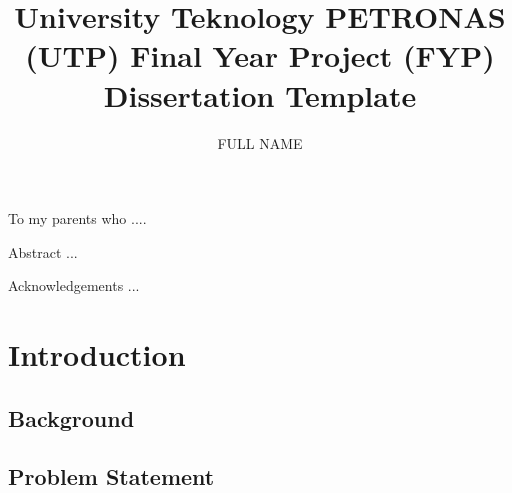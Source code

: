\documentclass[a4paper,12pt,oneside]{report}
\begin{document}
\title{University Teknology PETRONAS (UTP) Final Year Project (FYP) Dissertation Template}
\author{FULL NAME}
\beforepreface %


\begin{center}
To my parents who ....
\end{center}


Abstract ...


Acknowledgements ...


\clearpage
\afterpreface  %


\chapter{Introduction}
\label{ch1}
\section{Background}

\section{Problem Statement}
\end{document}
